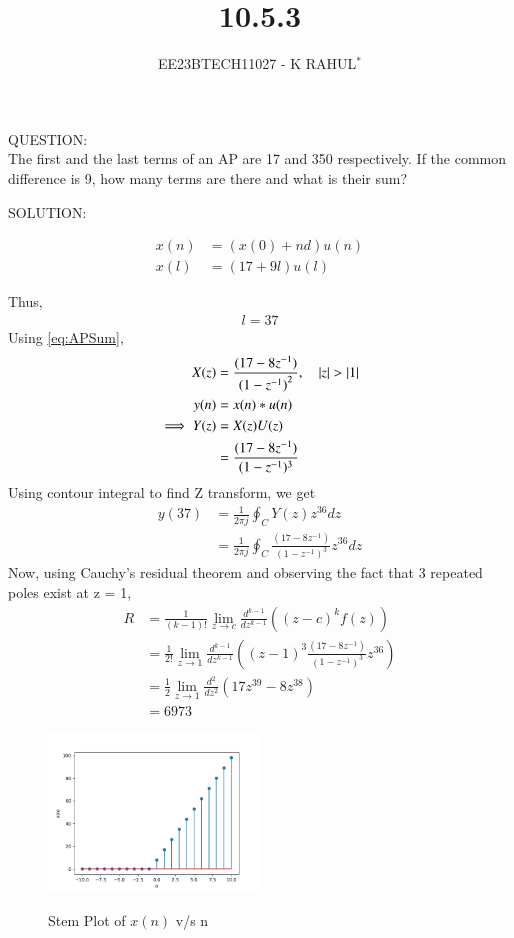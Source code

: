 \documentclass[journal,12pt,twocolumn]{IEEEtran}
\theoremstyle{remark}
\begin{document}

\vspace{3cm}
\title{10.5.3}
\author{EE23BTECH11027 - K RAHUL$^{*}$%
}
\maketitle
\newpage
\bigskip
\renewcommand{\thefigure}{\theenumi}
\renewcommand{\thetable}{\theenumi}
QUESTION:\\
The first and the last terms of an AP are 17 and 350 respectively. If the common difference
is 9, how many terms are there and what is their sum?\\
\bigskip \bigskip


SOLUTION:
\begin{table}[ht]

\end{table}
\begin{align}
x(n) &= (x(0) + nd)u(n)\\
x(l)&=(17+9l)u(l)
\end{align}

Thus,
\begin{align}{l = 37}\end{align}
Using \eqref{eq:APSum},
\begin{align}
	X(z) &= \frac{(17-8z^{-1})}{{(1-z^{-1})}^2},
\quad \left\vert z\right\vert > \left\vert1\right\vert\\
y(n) &= x(n) * u(n)\\
\implies Y(z) &= X(z)U(z)\\
&= \frac{(17-8z^{-1})}{(1-z^{-1})^{3}}\end{align}
\bigskip
Using contour integral to find Z transform, we get
\begin{align}
    y(37) &= \frac{1}{2\pi j} \oint _C Y(z)z^{36}dz\\
    &= \frac{1}{2\pi j} \oint _C \frac{(17-8z^{-1})}{(1-z^{-1})^{3}}z^{36}dz
\end{align}
Now, using Cauchy's residual theorem and observing the fact that 3 repeated poles exist at z = 1, 
\begin{align}
    R &= \frac{1}{(k-1)!}\lim_{z \to c}\frac{d^{k-1}}{dz^{k-1}}((z-c)^kf(z))\\
    &= \frac{1}{2!}\lim_{z \to 1}\frac{d^{k-1}}{dz^{k-1}}((z-1)^3\frac{(17-8z^{-1})}{(1-z^{-1})^{3}}z^{36})\\
    &=\frac{1}{2}\lim_{z \to 1}\frac{d^2}{dz^2}(17z^{39} - 8z^{38})\\
    &= 6973
\end{align}
\begin{figure}[h]
    \includegraphics[width=0.5\textwidth]{figs/x(n)_plot.png}\label{fig:stem-plot}
    \caption{Stem Plot of $x(n)$ v/s n}
\end{figure}
\end{document}
